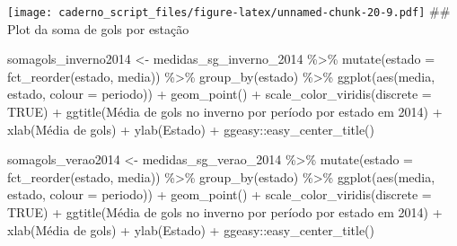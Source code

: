 \documentclass[
]{article}
\newenvironment{Shaded}{\begin{snugshade}}{\end{snugshade}}
\newcommand{\AttributeTok}[1]{\textcolor[rgb]{0.77,0.63,0.00}{#1}}
\newcommand{\ConstantTok}[1]{\textcolor[rgb]{0.00,0.00,0.00}{#1}}
\newcommand{\FunctionTok}[1]{\textcolor[rgb]{0.00,0.00,0.00}{#1}}
\newcommand{\NormalTok}[1]{#1}
\newcommand{\OtherTok}[1]{\textcolor[rgb]{0.56,0.35,0.01}{#1}}
\newcommand{\SpecialCharTok}[1]{\textcolor[rgb]{0.00,0.00,0.00}{#1}}
\newcommand{\StringTok}[1]{\textcolor[rgb]{0.31,0.60,0.02}{#1}}
\begin{document}
\texttt{[image: caderno\_script\_files/figure-latex/unnamed-chunk-20-9.pdf]}
\#\# Plot da soma de gols por estação

\begin{Shaded}
\begin{Highlighting}[]
\NormalTok{somagols\_inverno2014 }\OtherTok{\textless{}{-}}\NormalTok{ medidas\_sg\_inverno\_2014 }\SpecialCharTok{\%\textgreater{}\%} \FunctionTok{mutate}\NormalTok{(}\AttributeTok{estado =} \FunctionTok{fct\_reorder}\NormalTok{(estado, media)) }\SpecialCharTok{\%\textgreater{}\%} 
  \FunctionTok{group\_by}\NormalTok{(estado) }\SpecialCharTok{\%\textgreater{}\%}
  \FunctionTok{ggplot}\NormalTok{(}\FunctionTok{aes}\NormalTok{(media, estado, }\AttributeTok{colour =}\NormalTok{ periodo)) }\SpecialCharTok{+} \FunctionTok{geom\_point}\NormalTok{() }\SpecialCharTok{+}
  \FunctionTok{scale\_color\_viridis}\NormalTok{(}\AttributeTok{discrete =} \ConstantTok{TRUE}\NormalTok{) }\SpecialCharTok{+}
  \FunctionTok{ggtitle}\NormalTok{(}\StringTok{\textquotesingle{}Média de gols no inverno por período por estado em 2014\textquotesingle{}}\NormalTok{) }\SpecialCharTok{+} 
  \FunctionTok{xlab}\NormalTok{(}\StringTok{\textquotesingle{}Média de gols\textquotesingle{}}\NormalTok{) }\SpecialCharTok{+} \FunctionTok{ylab}\NormalTok{(}\StringTok{\textquotesingle{}Estado\textquotesingle{}}\NormalTok{) }\SpecialCharTok{+}
\NormalTok{  ggeasy}\SpecialCharTok{::}\FunctionTok{easy\_center\_title}\NormalTok{() }

\NormalTok{somagols\_verao2014 }\OtherTok{\textless{}{-}}\NormalTok{ medidas\_sg\_verao\_2014 }\SpecialCharTok{\%\textgreater{}\%} \FunctionTok{mutate}\NormalTok{(}\AttributeTok{estado =} \FunctionTok{fct\_reorder}\NormalTok{(estado, media)) }\SpecialCharTok{\%\textgreater{}\%} 
  \FunctionTok{group\_by}\NormalTok{(estado) }\SpecialCharTok{\%\textgreater{}\%}
  \FunctionTok{ggplot}\NormalTok{(}\FunctionTok{aes}\NormalTok{(media, estado, }\AttributeTok{colour =}\NormalTok{ periodo)) }\SpecialCharTok{+} \FunctionTok{geom\_point}\NormalTok{() }\SpecialCharTok{+}
  \FunctionTok{scale\_color\_viridis}\NormalTok{(}\AttributeTok{discrete =} \ConstantTok{TRUE}\NormalTok{) }\SpecialCharTok{+}
  \FunctionTok{ggtitle}\NormalTok{(}\StringTok{\textquotesingle{}Média de gols no inverno por período por estado em 2014\textquotesingle{}}\NormalTok{) }\SpecialCharTok{+} 
  \FunctionTok{xlab}\NormalTok{(}\StringTok{\textquotesingle{}Média de gols\textquotesingle{}}\NormalTok{) }\SpecialCharTok{+} \FunctionTok{ylab}\NormalTok{(}\StringTok{\textquotesingle{}Estado\textquotesingle{}}\NormalTok{) }\SpecialCharTok{+}
\NormalTok{  ggeasy}\SpecialCharTok{::}\FunctionTok{easy\_center\_title}\NormalTok{() }


\end{Highlighting}
\end{Shaded}
\end{document}
